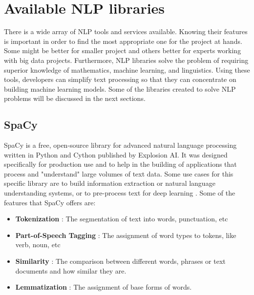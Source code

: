        
\section{Available NLP libraries}
    \label{sec:libraries}

    There is a wide array of NLP tools and services available. Knowing their features is important in order to find the most appropriate one for the project at hands. Some might be better for smaller project and others better for experts working with big data projects. Furthermore, NLP libraries solve the problem of requiring superior knowledge of mathematics, machine learning, and linguistics. Using these tools, developers can simplify text processing so that they can concentrate on building machine learning models. Some of the libraries created to solve NLP problems will be discussed in the next sections.





        \subsection{SpaCy}
        
        \par SpaCy is a free, open-source library for advanced natural language processing written in Python and Cython published by Explosion AI. It was designed specifically for production use and to help in the building of applications that process and "understand" large volumes of text data.  Some use cases for this specific library are to build information extraction or natural language understanding systems, or to pre-process text for deep learning \cite{Spacy2017}. Some of the features that SpaCy offers are: 

        \begin{itemize}
            \item \textbf{Tokenization} : The segmentation of text into words, punctuation, etc
            \item \textbf{Part-of-Speech Tagging} : The assignment of word types to tokens, like verb, noun, etc
            \item \textbf{Similarity} : The comparison between different words, phrases or text documents and how similar they are.
            \item \textbf{Lemmatization} : The assignment of base forms of words.
        \end{itemize}

      

